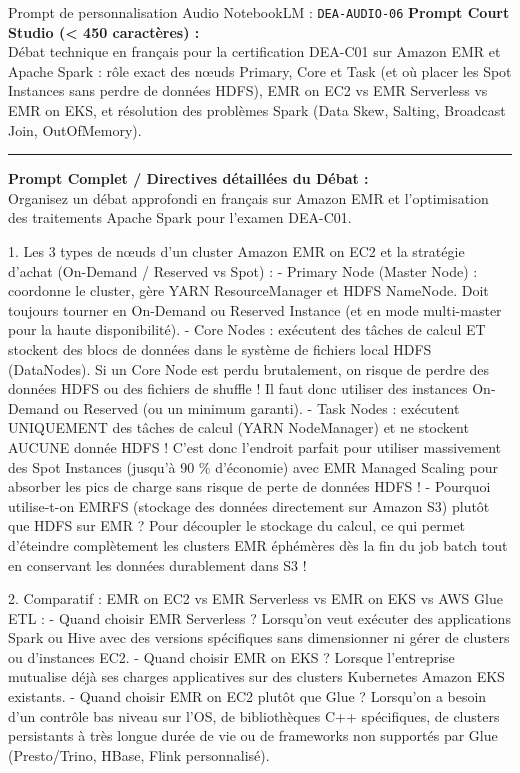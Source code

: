 \documentclass[11pt,a4paper]{article}
\begin{document}
\begin{promptbox}{Prompt de personnalisation Audio NotebookLM : \texttt{DEA-AUDIO-06}}
\textbf{Prompt Court Studio (< 450 caractères) :}\\
Débat technique en français pour la certification DEA-C01 sur Amazon EMR et Apache Spark : rôle exact des nœuds Primary, Core et Task (et où placer les Spot Instances sans perdre de données HDFS), EMR on EC2 vs EMR Serverless vs EMR on EKS, et résolution des problèmes Spark (Data Skew, Salting, Broadcast Join, OutOfMemory).

\medskip\hrule\medskip
\textbf{Prompt Complet / Directives détaillées du Débat :}\\
Organisez un débat approfondi en français sur Amazon EMR et l'optimisation des traitements Apache Spark pour l'examen DEA-C01.

1. Les 3 types de nœuds d'un cluster Amazon EMR on EC2 et la stratégie d'achat (On-Demand / Reserved vs Spot) :
- Primary Node (Master Node) : coordonne le cluster, gère YARN ResourceManager et HDFS NameNode. Doit toujours tourner en On-Demand ou Reserved Instance (et en mode multi-master pour la haute disponibilité).
- Core Nodes : exécutent des tâches de calcul ET stockent des blocs de données dans le système de fichiers local HDFS (DataNodes). Si un Core Node est perdu brutalement, on risque de perdre des données HDFS ou des fichiers de shuffle ! Il faut donc utiliser des instances On-Demand ou Reserved (ou un minimum garanti).
- Task Nodes : exécutent UNIQUEMENT des tâches de calcul (YARN NodeManager) et ne stockent AUCUNE donnée HDFS ! C'est donc l'endroit parfait pour utiliser massivement des Spot Instances (jusqu'à 90 \% d'économie) avec EMR Managed Scaling pour absorber les pics de charge sans risque de perte de données HDFS !
- Pourquoi utilise-t-on EMRFS (stockage des données directement sur Amazon S3) plutôt que HDFS sur EMR ? Pour découpler le stockage du calcul, ce qui permet d'éteindre complètement les clusters EMR éphémères dès la fin du job batch tout en conservant les données durablement dans S3 !

2. Comparatif : EMR on EC2 vs EMR Serverless vs EMR on EKS vs AWS Glue ETL :
- Quand choisir EMR Serverless ? Lorsqu'on veut exécuter des applications Spark ou Hive avec des versions spécifiques sans dimensionner ni gérer de clusters ou d'instances EC2.
- Quand choisir EMR on EKS ? Lorsque l'entreprise mutualise déjà ses charges applicatives sur des clusters Kubernetes Amazon EKS existants.
- Quand choisir EMR on EC2 plutôt que Glue ? Lorsqu'on a besoin d'un contrôle bas niveau sur l'OS, de bibliothèques C++ spécifiques, de clusters persistants à très longue durée de vie ou de frameworks non supportés par Glue (Presto/Trino, HBase, Flink personnalisé).


\end{promptbox}
\end{document}
